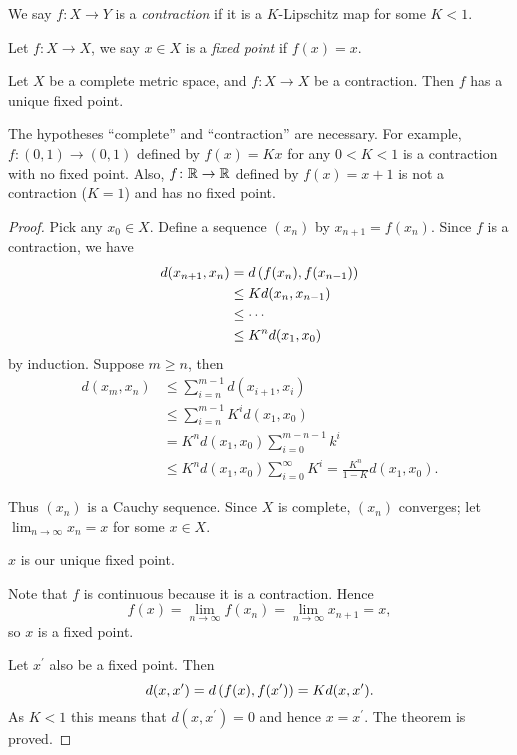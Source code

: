 We say $f\colon X\to Y$ is a \emph{contraction} if it is a $K$-Lipschitz map for some $K<1$.

Let $f\colon X\to X$, we say $x\in X$ is a \emph{fixed point} if $f(x)=x$.

\begin{theorem}
Let $X$ be a complete metric space, and $f\colon X\to X$ be a contraction. Then $f$ has a unique fixed point.
\end{theorem}

\begin{remark}
The hypotheses ``complete'' and ``contraction'' are necessary. For example, $f\colon (0,1)\to(0,1)$ defined by $f(x)=Kx$ for any $0<K<1$ is a contraction with no fixed point. Also, $f\colon \mathbb R\to\mathbb R$ defined by $f(x)=x+1$ is not a contraction ($K=1$) and has no fixed point.
\end{remark}

\begin{proof}
Pick any $x_0\in X$. Define a sequence $(x_n)$ by $x_{n+1}=f(x_n)$. Since $f$ is a contraction, we have
\begin{align*}
d(x_{n+1},x_n)
&=d\left(f(x_n),f(x_{n-1})\right)\\
&\le K d(x_n,x_{n-1})\\
&\le\cdots\\
&\le K^n d(x_1,x_0)
\end{align*}
by induction. Suppose $m\ge n$, then
\begin{align*}
d(x_m,x_n)
&\le\sum_{i=n}^{m-1}d(x_{i+1},x_i)\\
&\le\sum_{i=n}^{m-1}K^i d(x_1,x_0)\\
&=K^n d(x_1,x_0)\sum_{i=0}^{m-n-1}k^i\\
&\le K^n d(x_1,x_0)\sum_{i=0}^{\infty}K^i=\frac{K^n}{1-K}d(x_1,x_0).
\end{align*}

Thus $(x_n)$ is a Cauchy sequence. Since $X$ is complete, $(x_n)$ converges; let $\displaystyle\lim_{n\to\infty}x_n=x$ for some $x\in X$.

\begin{claim}
$x$ is our unique fixed point.
\end{claim}

Note that $f$ is continuous because it is a contraction. Hence
\[f(x)=\lim_{n\to\infty}f(x_n)=\lim_{n\to\infty}x_{n+1}=x,\]
so $x$ is a fixed point.

Let $x^\prime$ also be a fixed point. Then
\[d(x,x^\prime)=d\left(f(x),f(x^\prime)\right)=K d(x,x^\prime).\]
As $K<1$ this means that $d(x,x^\prime)=0$ and hence $x=x^\prime$. The theorem is proved.
\end{proof}

